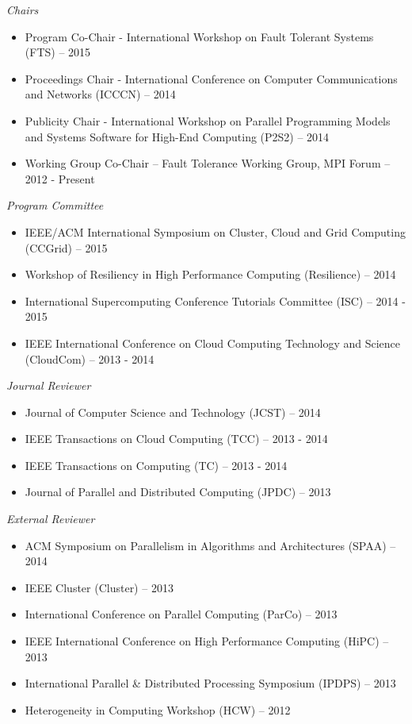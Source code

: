 {\sl Chairs}
\begin{itemize}
    \item Program Co-Chair - International Workshop on Fault Tolerant Systems
        (FTS) -- 2015
    \item Proceedings Chair - International Conference on Computer
        Communications and Networks (ICCCN) -- 2014
    \item Publicity Chair - International Workshop on Parallel Programming
        Models and Systems Software for High-End Computing (P2S2) -- 2014
    \item Working Group Co-Chair -- Fault Tolerance Working Group, MPI Forum -- 2012 - Present
\end{itemize}

{\sl Program Committee}
\begin{itemize}
    \item IEEE/ACM International Symposium on Cluster, Cloud and Grid
        Computing (CCGrid) -- 2015
    \item Workshop of Resiliency in High Performance Computing (Resilience) --
        2014
    \item International Supercomputing Conference Tutorials Committee (ISC) --
        2014 - 2015
    \item IEEE International Conference on Cloud Computing Technology and
        Science (CloudCom) -- 2013 - 2014
\end{itemize}

{\sl Journal Reviewer}
\begin{itemize}
    \item Journal of Computer Science and Technology (JCST) -- 2014
    \item IEEE Transactions on Cloud Computing (TCC) -- 2013 - 2014
    \item IEEE Transactions on Computing (TC) -- 2013 - 2014
    \item Journal of Parallel and Distributed Computing (JPDC) -- 2013
\end{itemize}

{\sl External Reviewer}
\begin{itemize}
    \item ACM Symposium on Parallelism in Algorithms and Architectures (SPAA) -- 2014
    \item IEEE Cluster (Cluster) -- 2013
    \item International Conference on Parallel Computing (ParCo) -- 2013
    \item IEEE International Conference on High Performance Computing (HiPC) -- 2013
    \item International Parallel \& Distributed Processing Symposium (IPDPS) -- 2013
    \item Heterogeneity in Computing Workshop (HCW) -- 2012
\end{itemize}

